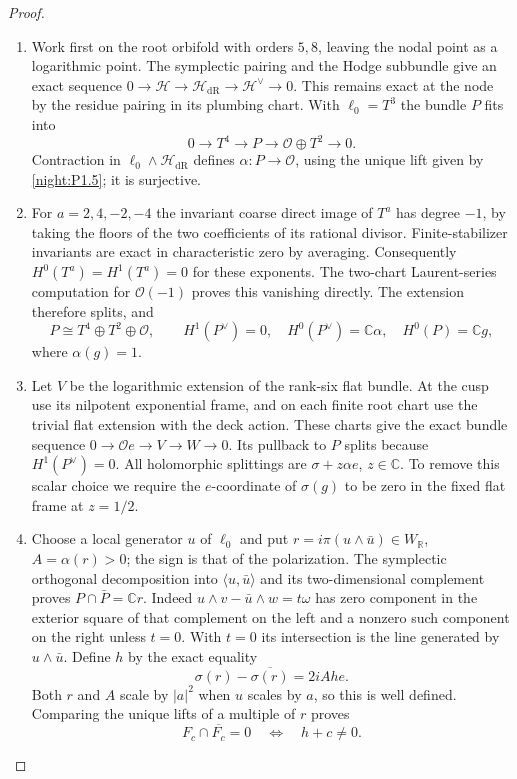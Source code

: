\begin{proof}
\begin{enumerate}[label={$\langle1\rangle$\arabic*.}]
\item Work first on the root orbifold with orders $5,8$, leaving the nodal
point as a logarithmic point.  The symplectic pairing and the Hodge
subbundle give an exact sequence
$0\to\mathcal H\to\mathcal H_{\mathrm{dR}}\to\mathcal H^\vee\to0$.
This remains exact at the node by the residue pairing in its plumbing
chart.  With $\ell_0=T^3$ the bundle $P$ fits into
\[
0\longrightarrow T^4\longrightarrow P
 \longrightarrow\mathcal O\oplus T^2\longrightarrow0.
\]
Contraction in $\ell_0\wedge\mathcal H_{\mathrm{dR}}$ defines
$\alpha:P\to\mathcal O$, using the unique lift given by \cref{night:P1.5};
it is surjective.  

\item For $a=2,4,-2,-4$ the invariant coarse direct image of $T^a$ has degree
$-1$, by taking the floors of the two coefficients of its rational
divisor.  Finite-stabilizer invariants are exact in characteristic zero
by averaging.  Consequently $H^0(T^a)=H^1(T^a)=0$ for these exponents.
The two-chart Laurent-series computation for $\mathcal O(-1)$ proves
this vanishing directly.  The extension therefore splits, and
\[
P\cong T^4\oplus T^2\oplus\mathcal O,\qquad
H^1(P^\vee)=0,\quad H^0(P^\vee)=\mathbb C\alpha,
\quad H^0(P)=\mathbb Cg,
\]
where $\alpha(g)=1$.

\item Let $V$ be the logarithmic extension of the rank-six flat
bundle.  At the cusp use its nilpotent exponential frame, and on each
finite root chart use the trivial flat extension with the deck action.
These charts give the exact bundle sequence
$0\to\mathcal Oe\to V\to W\to0$.
Its pullback to $P$ splits because $H^1(P^\vee)=0$.
All holomorphic splittings are $\sigma+z\alpha e$, $z\in\mathbb C$.
To remove this scalar choice we require the $e$-coordinate of
$\sigma(g)$ to be zero in the fixed flat frame at $z=1/2$.

\item Choose a local generator $u$ of $\ell_0$ and put
$r=i\pi(u\wedge\bar u)\in W_{\mathbb R}$, $A=\alpha(r)>0$;
the sign is that of the polarization.  The symplectic orthogonal
decomposition into $\langle u,\bar u\rangle$ and its two-dimensional
complement proves $P\cap\bar P=\mathbb Cr$.
Indeed $u\wedge v-\bar u\wedge w=t\omega$ has zero component in the
exterior square of that complement on the left and a nonzero such
component on the right unless $t=0$.  With $t=0$ its intersection is
the line generated by $u\wedge\bar u$.
Define $h$ by the exact equality
\[
\sigma(r)-\overline{\sigma(r)}=2iAh e.
\]
Both $r$ and $A$ scale by $|a|^2$ when $u$ scales by $a$, so this is
well defined.  Comparing the unique lifts of a multiple of $r$ proves
\[
F_c\cap\overline{F_c}=0\quad\Longleftrightarrow\quad h+c\ne0.
\]


\end{enumerate}
\end{proof}
